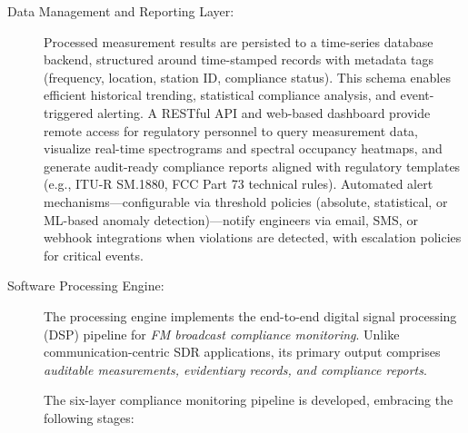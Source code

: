 \documentclass[11pt]{report}
\begin{document}
\begin{description}
\item[Data Management and Reporting Layer: ]
Processed measurement results are persisted to a time-series database backend, structured around time-stamped records with metadata tags (frequency, location, station ID, compliance status). This schema enables efficient historical trending, statistical compliance analysis, and event-triggered alerting. A RESTful API and web-based dashboard provide remote access for regulatory personnel to query measurement data, visualize real-time spectrograms and spectral occupancy heatmaps, and generate audit-ready compliance reports aligned with regulatory templates (e.g., ITU-R SM.1880, FCC Part 73 technical rules). Automated alert mechanisms---configurable via threshold policies (absolute, statistical, or ML-based anomaly detection)---notify engineers via email, SMS, or webhook integrations when violations are detected, with escalation policies for critical events.

\item[Software Processing Engine:] 
The processing engine implements the end-to-end digital signal processing (DSP) pipeline for \emph{FM broadcast compliance monitoring}. Unlike communication-centric SDR applications, its primary output comprises \emph{auditable measurements, evidentiary records, 	and compliance reports}. 

The six-layer compliance monitoring pipeline is developed, embracing the following stages:
\begin{figure}[!ht]
	\centering
\end{figure}
\end{description}
\end{document}
